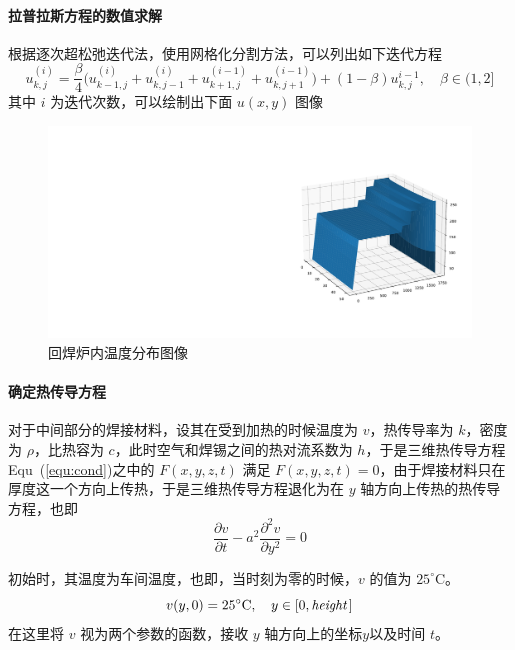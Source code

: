 \documentclass[../main.tex]{subfiles}
\begin{document}
\paragraph{拉普拉斯方程的数值求解} 根据逐次超松弛迭代法，使用网格化分割方法，可以列出如下迭代方程
\begin{equation}
u_{k,j} ^{(i)} = \frac{\beta}{4} \bigg( u_{k-1, j} ^{(i)} + u_{k,j-1} ^{(i)} + u_{k+1,j} ^{(i-1)}+ u _{k, j+ 1} ^{(i-1)} \bigg) + (1- \beta) u_{k,j} ^{i-1} ,\quad \beta \in (1, 2]
\end{equation}
其中 \(i\) 为迭代次数，可以绘制出下面 \(u ( x , y)\) 图像

\begin{figure}[H]
\centering
\includegraphics[scale = 0.5]{fig1.pdf}\caption{回焊炉内温度分布图像}
\end{figure}

\paragraph{确定热传导方程} 对于中间部分的焊接材料，设其在受到加热的时候温度为 \(v\)，热传导率为 \(k\)，密度为 \(\rho\)，比热容为 \(c\)，此时空气和焊锡之间的热对流系数为 \(h\)，于是三维热传导方程Equ~(\ref{equ:cond})之中的 \(F (x, y , z, t)\) 满足 \(F ( x , y , z ,t ) = 0\)，由于焊接材料只在厚度这一个方向上传热，于是三维热传导方程退化为在 \(y\) 轴方向上传热的热传导方程，也即
\begin{equation}\label{equ:one-dim}
\frac{\partial v}{\partial t} - a ^{2} \frac{\partial^{2} v }{\partial y ^{2}} = 0
\end{equation}

初始时，其温度为车间温度，也即，当时刻为零的时候，\(v\) 的值为 \(25 ^{\circ}\mathrm{C}\)。
\begin{equation}
v (y, 0) = 25 ^{\circ}\mathrm{C}, \quad y \in [0, {\it height}\kern 1pt]
\end{equation}
在这里将 \(v\) 视为两个参数的函数，接收 \(y\) 轴方向上的坐标\(y\)以及时间 \(t\)。
\end{document}
